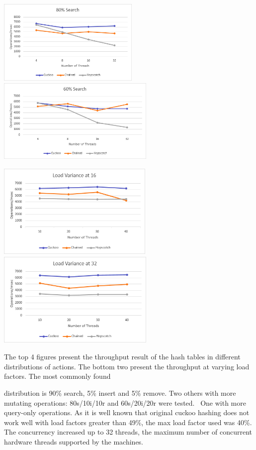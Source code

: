 \documentclass{article}
\begin{document}
 \includegraphics[width=2.6736in,height=1.6043in]{Report-img011.png} 
\includegraphics[width=2.9791in,height=1.589in]{Report-img012.png} 

 \includegraphics[width=2.9583in,height=1.8083in]{Report-img013.png} 
\includegraphics[width=2.9791in,height=1.7992in]{Report-img014.png} 


\bigskip

The top 4 figures present the throughput result of the hash tables in different distributions of actions. The bottom two
present the throughput at varying load factors. The most commonly found

distribution is 90\% search, 5\% insert and 5\% remove. Two others with more mutating operations: 80s/10i/10r and
60s/20i/20r were tested. \ One with more query-only operations. As it is well known that original cuckoo hashing does
not work well with load factors greater than 49\%, the max load factor used was 40\%. The concurrency increased up to
32 threads, the maximum number of concurrent hardware threads supported by the machines.
\end{document}
